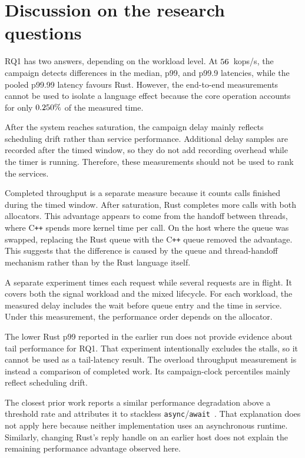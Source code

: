 \documentclass[english,oneside,a4paper,censored,csm,software-track-2020]{HYthesisML}
\begin{document}
\section{Discussion on the research questions}\label{sec:rqdiscussion}
RQ1 has two answers, depending on the workload level. At $56$~kops/s,
the campaign detects differences in the median, p99, and p99.9 latencies, while
the pooled p99.99 latency favours Rust. However, the end-to-end measurements
cannot be used to isolate a language effect because the core operation accounts
for only $0.250\%$ of the measured time.

After the system reaches saturation, the campaign delay mainly reflects
scheduling drift rather than service performance. Additional delay samples are
recorded after the timed window, so they do not add recording overhead while
the timer is running. Therefore, these measurements should not be used to rank
the services.

Completed throughput is a separate measure because it counts calls finished
during the timed window. After saturation, Rust completes more calls with both
allocators. This
advantage appears to come from the handoff between threads, where
C\texttt{++} spends more kernel time per call. On the host where the queue was
swapped, replacing the Rust queue with the C\texttt{++} queue removed the
advantage. This suggests that the difference is caused by the queue and
thread-handoff mechanism rather than by the Rust language itself.

A separate experiment times each request while several requests are in flight.
It covers both the signal workload and the mixed lifecycle. For each workload,
the measured delay includes the wait before queue entry and the time in service.
Under this measurement, the performance order depends on the allocator.

The lower Rust p99 reported in the earlier run does not provide evidence about
tail performance for RQ1. That experiment intentionally excludes the stalls,
so it cannot be used as a tail-latency result. The overload throughput
measurement is instead a comparison of completed work. Its campaign-clock
percentiles mainly reflect scheduling drift.

The closest prior work reports a similar performance degradation above a
threshold rate and attributes it to stackless
\texttt{async}/\texttt{await}~\cite{arvidsson2025async}. That explanation does
not apply here because neither implementation uses an asynchronous runtime.
Similarly, changing Rust's reply handle on an earlier host does not explain the
remaining performance advantage observed here.
\end{document}

